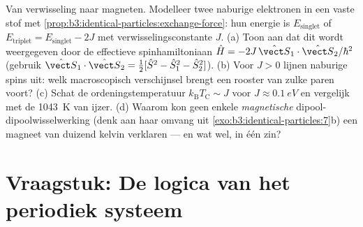 \begin{exercise}[$\star\star\star$]\label{exo:b3:identical-particles:12}
Van verwisseling naar magneten. Modelleer twee naburige elektronen in een
vaste stof met \cref{prop:b3:identical-particles:exchange-force}: hun
energie is $E_{\text{singlet}}$ of $E_{\text{triplet}} =
E_{\text{singlet}} - 2J$ met verwisselingsconstante $J$. (a) Toon aan dat
dit wordt weergegeven door de effectieve spinhamiltoniaan $\hat H =
-2J\,\hat{\vect S}_1\cdot\hat{\vect S}_2/\hbar^2$ (gebruik
$\hat{\vect S}_1\cdot\hat{\vect S}_2 = \tfrac12[\hat S^2 - \hat
S_1^2 - \hat S_2^2]$). (b) Voor $J > 0$ lijnen naburige spins uit: welk
macroscopisch verschijnsel brengt een rooster van zulke paren voort? (c)
Schat de ordeningstemperatuur $k_{\text{B}}T_{\text{C}}
\sim J$ voor $J \approx \qty{0.1}{eV}$ en vergelijk met de \qty{1043}{K} van ijzer. (d)
Waarom kon geen enkele \emph{magnetische} dipool-dipoolwisselwerking (denk
aan haar omvang uit \cref{exo:b3:identical-particles:7}b) een magneet van
duizend kelvin verklaren --- en wat wel, in één zin?
\end{exercise}

\section{Vraagstuk: De logica van het periodiek systeem}

